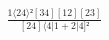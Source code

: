 \documentclass[varwidth, border=5pt]{standalone}
\begin{document}
\begin{my}
$\begin{gathered}
\scriptscriptstyle\frac{1⟨24⟩²[34][12][23]}{[24]⟨4|1+2|4]²}
\end{gathered}$
\end{my}
\end{document}
